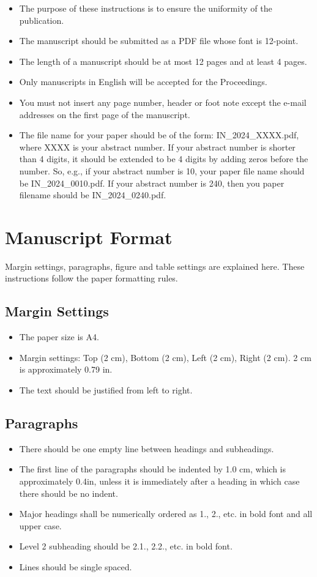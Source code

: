 \documentclass[a4paper,12pt]{article}
\newcommand{\YearConf}{2024}
\begin{document}
\begin{itemize}[noitemsep]
\item 
The purpose of these instructions is to ensure the uniformity of the publication. 
\item
The manuscript should be submitted as a PDF file whose font is 12-point.
\item
The length of a manuscript should be at most 12 pages and at least 4 pages. 
\item
Only manuscripts in English will be accepted for the Proceedings. 
\item
You must not insert any page number, header or foot note except the e-mail addresses on the first page of the manuscript.
\item
The file name for your paper should be of the form:  IN\_\YearConf\_XXXX.pdf, where XXXX is your abstract number. If your abstract number is shorter than 4 digits, it should be extended to be 4 digits by adding zeros before the number.  
So, e.g., if your abstract number is 10, your paper file name should be IN\_\YearConf\_0010.pdf. If your abstract number is 240, then you paper filename should be IN\_\YearConf\_0240.pdf. 
\end{itemize}

\section{Manuscript Format}
\noindent
Margin settings, paragraphs, figure and table settings are explained here.  These instructions follow the paper formatting rules.  

\subsection{Margin Settings}
\begin{itemize}[noitemsep]
\item
The paper size is A4.
\item
Margin settings: Top (2 cm), Bottom (2 cm), Left (2 cm), Right (2 cm).  2 cm is approximately 0.79 in.
\item
The text should be justified from left to right.
\end{itemize}

\subsection{Paragraphs}

\begin{itemize}[noitemsep]
\item
There should be one empty line between headings and subheadings.
\item
The first line of the paragraphs should be indented by 1.0 cm,  which is approximately 0.4in, unless it is immediately after a heading in which case there should be no indent. 
\item
Major headings shall be numerically ordered as 1., 2.,  etc. in bold font and all upper case.
\item
Level 2 subheading should be 2.1., 2.2.,  etc. in bold font.
\item
Lines should be single spaced.
\end{itemize}
\end{document}
